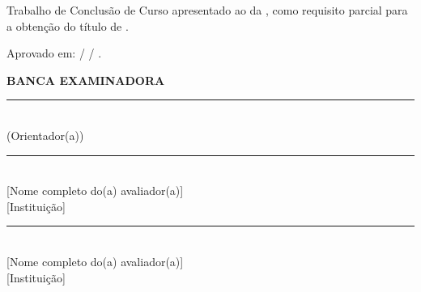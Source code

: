 \vspace{1cm}
\noindent\hspace{0.45\textwidth}\begin{minipage}{0.55\textwidth}
\singlespacing\small
Trabalho de Conclusão de Curso apresentado ao \curso{} da \instituicao, como requisito parcial
para a obtenção do título de \grau.
\end{minipage}

\vspace{1cm}
\noindent Aprovado em: \underline{\hspace{1cm}} / \underline{\hspace{1cm}} / \underline{\hspace{1.6cm}}.

\vspace{1cm}
\begin{center}
\textbf{BANCA EXAMINADORA}

\vspace{1.6cm}
\rule{10cm}{0.4pt}\\
\orientacao{} (Orientador(a))\\
\instituicao

\vspace{1.4cm}
\rule{10cm}{0.4pt}\\
{[Nome completo do(a) avaliador(a)]}\\
{[Instituição]}

\vspace{1.4cm}
\rule{10cm}{0.4pt}\\
{[Nome completo do(a) avaliador(a)]}\\
{[Instituição]}
\end{center}

